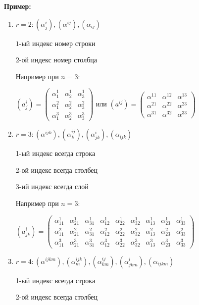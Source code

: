 \textbf{Пример:}
\begin{enumerate}


\item $r =2: (\alpha^i_j), (\alpha^{ij}),(\alpha_{ij})$

$1$-ый индекс номер строки

$2$-ой индекс номер столбца

Например при $n= 3$:

$(a^{i}_j) = \begin{pmatrix}
    \alpha^{1}_1 &\alpha^1_2 & \alpha_3^1\\
    \alpha_1^2 & \alpha_2^2 & \alpha_3^2 \\
    \alpha_1^3 & \alpha_2^3 & \alpha_3^3
\end{pmatrix}$
или
$(a^{ij}) = \begin{pmatrix}
    \alpha^{11} &\alpha^{12} & \alpha^{13}\\
    \alpha^{21} & \alpha^{22} & \alpha^{23} \\
    \alpha^{31} & \alpha^{32} & \alpha^{33}
\end{pmatrix}$

\item $r=3: (\alpha^{ijk}), (\alpha^{ij}_k), (\alpha^{i}_{jk}), (\alpha_{ijk}) $

    1-ый индекс всегда строка

    2-ой индекс всегда столбец

    3-ий индекс всегда слой

Например при $n=3$:

$(a^i_{jk}) = \left(
\begin{array}{ccc|ccc|ccc}
    \alpha^1_{11} & \alpha^1_{21} & \alpha^1_{31} & \alpha^1_{12} & \alpha^1_{22} & \alpha^1_{32} & \alpha^1_{13} & \alpha^1_{23} & \alpha^1_{33} \\
    \alpha^2_{11} & \alpha^2_{21} & \alpha^2_{31} & \alpha^2_{12} & \alpha^2_{22} & \alpha^2_{32} & \alpha^2_{13} & \alpha^2_{23} & \alpha^2_{33} \\
    \alpha^3_{11} & \alpha^3_{21} & \alpha^3_{31} & \alpha^3_{12} & \alpha^3_{22} & \alpha^3_{32} & \alpha^3_{13} & \alpha^3_{23} & \alpha^3_{33}
\end{array}
\right)$

\item $r=4: (\alpha^{ijkm}),(\alpha^{ijk}_{m}),(\alpha^{ij}_{km}), (\alpha^{i}_{jkm}), (\alpha_{ijkm})$

1-ый индекс всегда строка

2-ой индекс всегда столбец


\end{enumerate}
